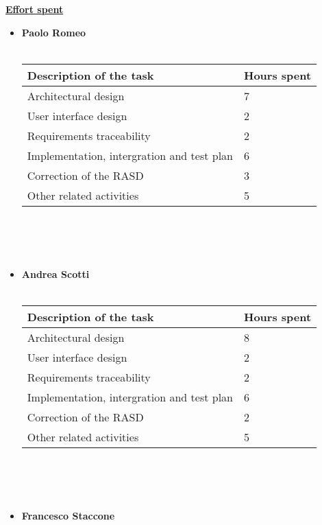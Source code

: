 	\underline{\textbf{Effort spent}}
		\begin{itemize}
		\item \textbf{Paolo Romeo}\\\\
				\begin{tabular}{| m{9cm} | m{3cm}| }
				\hline
					\textbf{Description of the task} & \textbf{Hours spent}\\
				\hline
					Architectural design & 7 \\
				\hline
					User interface design & 2 \\
				\hline
					Requirements traceability & 2 \\
				\hline
					Implementation, intergration and test plan & 6 \\
				\hline
					Correction of the RASD & 3 \\
				\hline
					Other related activities & 5 \\
				\hline
				\end{tabular}
				\\\\\\
		\item \textbf{Andrea Scotti}\\\\
				\begin{tabular}{| m{9cm} | m{3cm}| }
				\hline
					\textbf{Description of the task} & \textbf{Hours spent}\\
				\hline
					Architectural design & 8 \\
				\hline
					User interface design & 2 \\
				\hline
					Requirements traceability & 2 \\
				\hline
					Implementation, intergration and test plan & 6 \\
				\hline
					Correction of the RASD & 2 \\
				\hline
					Other related activities & 5 \\
				\hline
				\end{tabular}
				\\\\\\
		\item \textbf{Francesco Staccone}\\\\
				\begin{tabular}{| m{9cm} | m{3cm}| }
				\hline

\end{tabular}
\end{itemize}
